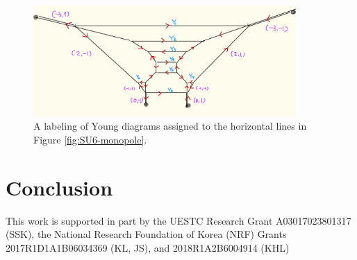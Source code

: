 \documentclass[letterpaper, 11pt]{article}
\begin{document}
\begin{figure}[t]
\centering
\includegraphics[width=10cm]{SU6young.jpeg}
\caption{A labeling of Young diagrams assigned to the horizontal lines in Figure \ref{fig:SU6-monopole}.}
\label{fig:SU6young}
\end{figure}



\section{Conclusion} \label{sec:conclusion}


\acknowledgments
This work is supported in part by the UESTC Research Grant A03017023801317 (SSK), the National Research Foundation of Korea (NRF) Grants 2017R1D1A1B06034369 (KL, JS), and 2018R1A2B6004914 (KHL)




\end{document}
